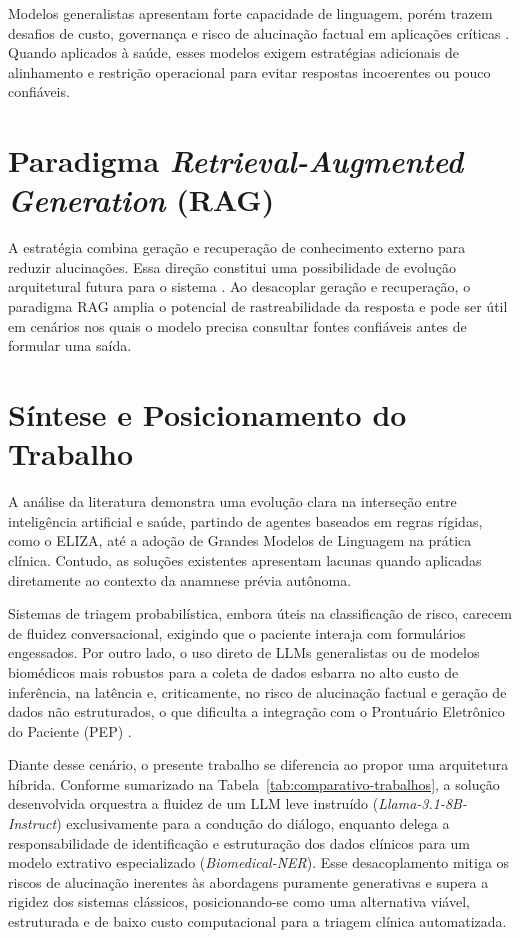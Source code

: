 Modelos generalistas apresentam forte capacidade de linguagem, porém trazem desafios de custo,
governança e risco de alucinação factual em aplicações críticas \cite{metaai2024,ouyang2022}.
Quando aplicados à saúde, esses modelos exigem estratégias adicionais de alinhamento e
restrição operacional para evitar respostas incoerentes ou pouco confiáveis.

\section{Paradigma \textit{Retrieval-Augmented Generation} (RAG)}

A estratégia combina geração e recuperação de conhecimento
externo para reduzir alucinações. Essa direção constitui uma possibilidade de evolução
arquitetural futura para o sistema \cite{aws2026,lewis2020}. Ao desacoplar geração e
recuperação, o paradigma RAG amplia o potencial de rastreabilidade da resposta e pode ser útil
em cenários nos quais o modelo precisa consultar fontes confiáveis antes de formular uma saída.

\section{Síntese e Posicionamento do Trabalho}

A análise da literatura demonstra uma evolução clara na interseção entre inteligência artificial
e saúde, partindo de agentes baseados em regras rígidas, como o ELIZA, até a adoção de Grandes
Modelos de Linguagem na prática clínica. Contudo, as soluções existentes apresentam lacunas
quando aplicadas diretamente ao contexto da anamnese prévia autônoma.

Sistemas de triagem probabilística, embora úteis na classificação de risco, carecem de fluidez
conversacional, exigindo que o paciente interaja com formulários engessados. Por outro lado, o
uso direto de LLMs generalistas ou de modelos biomédicos mais robustos para a coleta de dados
esbarra no alto custo de inferência, na latência e, criticamente, no risco de alucinação
factual e geração de dados não estruturados, o que dificulta a integração com o Prontuário
Eletrônico do Paciente (PEP) \cite{metaai2024,richens2020,singhal2023}.

Diante desse cenário, o presente trabalho se diferencia ao propor uma arquitetura híbrida.
Conforme sumarizado na Tabela~\ref{tab:comparativo-trabalhos}, a solução desenvolvida
orquestra a fluidez de um LLM leve instruído (\textit{Llama-3.1-8B-Instruct}) exclusivamente
para a condução do diálogo, enquanto delega a responsabilidade de identificação e
estruturação dos dados clínicos para um modelo extrativo especializado
(\textit{Biomedical-NER}). Esse desacoplamento mitiga os riscos de alucinação inerentes às
abordagens puramente generativas e supera a rigidez dos sistemas clássicos, posicionando-se
como uma alternativa viável, estruturada e de baixo custo computacional para a triagem clínica
automatizada.

